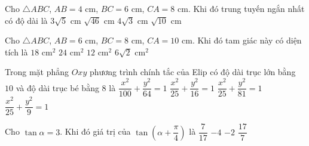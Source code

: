 \begin{ex}%
Cho $\triangle ABC$, $AB=4$ cm, $BC=6$ cm, $CA=8$ cm. Khi đó trung tuyến ngắn nhất có độ dài là
\choice
{$3\sqrt{5}$ cm}
{$\sqrt{46}$ cm}
{$4\sqrt{3}$ cm}
{\True $\sqrt{10}$ cm}
\end{ex}

\begin{ex}%
Cho $\triangle ABC$, $AB=6$ cm, $BC=8$ cm, $CA=10$ cm. Khi đó tam giác này có diện tích là
\choice
{$18$ cm$^2$}
{\True $24$ cm$^2$}
{$12$ cm$^2$}
{$6\sqrt{2}$ cm$^2$}
\end{ex}

\begin{ex}%
Trong mặt phẳng $Oxy$ phương trình chính tắc của Elip có độ dài trục lớn bằng $10$ và độ dài trục bé bằng $8$ là
\choice
{$\dfrac{x^2}{100}+\dfrac{y^2}{64}=1$}
{\True $\dfrac{x^2}{25}+\dfrac{y^2}{16}=1$}
{$\dfrac{x^2}{25}+\dfrac{y^2}{81}=1$}
{$\dfrac{x^2}{25}+\dfrac{y^2}{9}=1$}
\end{ex}

\begin{ex}%
Cho $\tan\alpha =3$. Khi đó giá trị của $\tan \left(\alpha+\dfrac{\pi}{4}\right)$ là
\choice
{$\dfrac{7}{17}$}
{$-4$}
{\True $-2$}
{$\dfrac{17}{7}$}
\end{ex}

